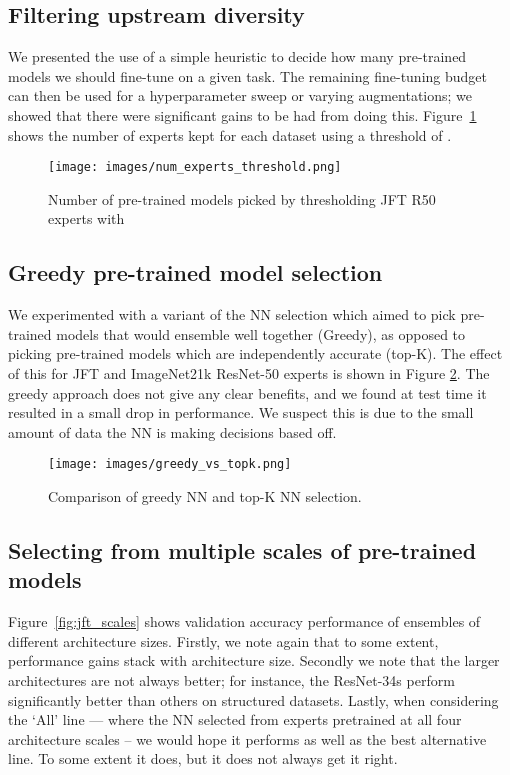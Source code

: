 \documentclass{article} \usepackage{iclr2021_conference,times}
\begin{document}
\subsection{Filtering upstream diversity}
\label{app:num_experts_threshold}
We presented the use of a simple heuristic to decide how many pre-trained models we should fine-tune on a given task. The remaining fine-tuning budget can then be used for a hyperparameter sweep or varying augmentations; we showed that there were significant gains to be had from doing this. Figure~\ref{fig:threshold} shows the number of experts kept for each dataset using a threshold of .
\begin{figure}[!htb]
    \centering
    \texttt{[image: images/num\_experts\_threshold.png]}
    \caption{Number of pre-trained models picked by thresholding JFT R50 experts with }
    \label{fig:threshold}
\end{figure}


\subsection{Greedy pre-trained model selection}
\label{app:greedy_NN}
We experimented with a variant of the NN selection which aimed to pick pre-trained models that would ensemble well together (Greedy), as opposed to picking pre-trained models which are independently accurate (top-K). The effect of this for JFT and ImageNet21k ResNet-50 experts is shown in Figure \ref{fig:greedy_vs_topk}. The greedy approach does not give any clear benefits, and we found at test time it resulted in a small drop in performance. We suspect this is due to the small amount of data the NN is making decisions based off.

\begin{figure}[!htb]
    \centering
    \texttt{[image: images/greedy\_vs\_topk.png]}
    \caption{Comparison of greedy NN and top-K NN selection.}
    \label{fig:greedy_vs_topk}
\end{figure}


\subsection{Selecting from multiple scales of pre-trained models}
\label{app:scale}
Figure~\ref{fig:jft_scales} shows validation accuracy performance of ensembles of different architecture sizes. Firstly, we note again that to some extent, performance gains stack with architecture size. Secondly we note that the larger architectures are not always better; for instance, the ResNet-34s perform significantly better than others on structured datasets. Lastly, when considering the `All' line --- where the NN selected from experts pretrained at all four architecture scales -- we would hope it performs as well as the best alternative line. To some extent it does, but it does not always get it right. 
\end{document}
